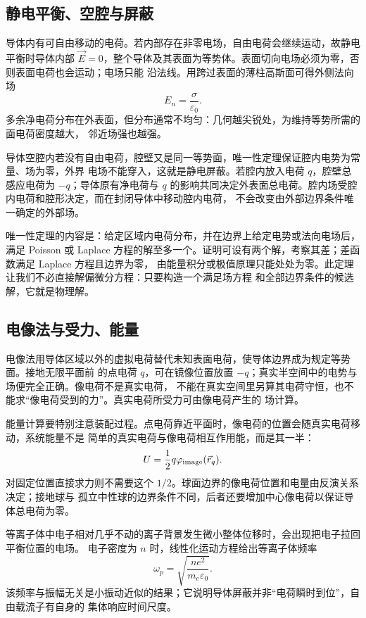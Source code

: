 \subsection*{静电平衡、空腔与屏蔽}

导体内有可自由移动的电荷。若内部存在非零电场，自由电荷会继续运动，故静电平衡时导体内部
$\vec E=0$，整个导体及其表面为等势体。表面切向电场必须为零，否则表面电荷也会运动；电场只能
沿法线。用跨过表面的薄柱高斯面可得外侧法向场
\[
 E_n=\frac\sigma{\varepsilon_0}.
\]
多余净电荷分布在外表面，但分布通常不均匀：几何越尖锐处，为维持等势所需的面电荷密度越大，
邻近场强也越强。

导体空腔内若没有自由电荷，腔壁又是同一等势面，唯一性定理保证腔内电势为常量、场为零，外界
电场不能穿入，这就是静电屏蔽。若腔内放入电荷 $q$，腔壁总感应电荷为 $-q$；导体原有净电荷与
$q$ 的影响共同决定外表面总电荷。腔内场受腔内电荷和腔形决定，而在封闭导体中移动腔内电荷，
不会改变由外部边界条件唯一确定的外部场。

唯一性定理的内容是：给定区域内电荷分布，并在边界上给定电势或法向电场后，满足 Poisson 或
Laplace 方程的解至多一个。证明可设有两个解，考察其差；差函数满足 Laplace 方程且边界为零，
由能量积分或极值原理只能处处为零。此定理让我们不必直接解偏微分方程：只要构造一个满足场方程
和全部边界条件的候选解，它就是物理解。

\subsection*{电像法与受力、能量}

电像法用导体区域以外的虚拟电荷替代未知表面电荷，使导体边界成为规定等势面。接地无限平面前
的点电荷 $q$，可在镜像位置放置 $-q$；真实半空间中的电势与场便完全正确。像电荷不是真实电荷，
不能在真实空间里另算其电荷守恒，也不能求“像电荷受到的力”。真实电荷所受力可由像电荷产生的
场计算。

能量计算要特别注意装配过程。点电荷靠近平面时，像电荷的位置会随真实电荷移动，系统能量不是
简单的真实电荷与像电荷相互作用能，而是其一半：
\[
 U=\frac12q\varphi_{\rm image}(\vec r_q).
\]
对固定位置直接求力则不需要这个 $1/2$。球面边界的像电荷位置和电量由反演关系决定；接地球与
孤立中性球的边界条件不同，后者还要增加中心像电荷以保证导体总电荷为零。

等离子体中电子相对几乎不动的离子背景发生微小整体位移时，会出现把电子拉回平衡位置的电场。
电子密度为 $n$ 时，线性化运动方程给出等离子体频率
\[
 \omega_p=\sqrt{\frac{ne^2}{m_e\varepsilon_0}}.
\]
该频率与振幅无关是小振动近似的结果；它说明导体屏蔽并非“电荷瞬时到位”，自由载流子有自身的
集体响应时间尺度。

